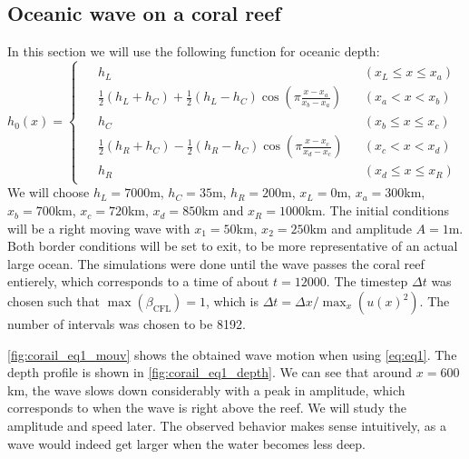 \subsection{Oceanic wave on a coral reef}

In this section we will use the following function for oceanic depth:
\begin{equation}
    h_0(x) = \begin{cases}
        \begin{aligned}
            &h_L &&(x_L \le x \le x_a) \\
            &\frac{1}{2}(h_L + h_C) + \frac{1}{2}(h_L - h_C) \cos \left( \pi \frac{x-x_a}{x_b-x_a} \right) &&(x_a < x < x_b) \\
            &h_C &&(x_b \le x \le x_c) \\
            &\frac{1}{2}(h_R + h_C) - \frac{1}{2}(h_R - h_C) \cos \left( \pi \frac{x-x_c}{x_d-x_c} \right) &&(x_c < x < x_d) \\
            &h_R &&(x_d \le x \le x_R)
        \end{aligned}
    \end{cases}
\end{equation}
We will choose \(h_L = 7000\)m, \(h_C = 35\)m, \(h_R = 200\)m, \(x_L = 0\)m, \(x_a = 300\)km, \(x_b = 700\)km, \(x_c = 720\)km, \(x_d = 850\)km and \(x_R = 1000\)km. The initial conditions will be a right moving wave with \(x_1 = 50\)km, \(x_2 = 250\)km and amplitude \(A = 1\)m. Both border conditions will be set to exit, to be more representative of an actual large ocean. The simulations were done until the wave passes the coral reef entierely, which corresponds to a time of about \(t = 12000\). The timestep \(\Delta t\) was chosen such that \(\max(\beta_{\textrm{CFL}}) = 1\), which is \(\Delta t = \Delta x / \max_x(u(x)^2)\). The number of intervals was chosen to be 8192.

\autoref{fig:corail_eq1_mouv} shows the obtained wave motion when using \autoref{eq:eq1}. The depth profile is shown in \autoref{fig:corail_eq1_depth}. We can see that around \(x=600\)km, the wave slows down considerably with a peak in amplitude, which corresponds to when the wave is right above the reef. We will study the amplitude and speed later. The observed behavior makes sense intuitively, as a wave would indeed get larger when the water becomes less deep.


